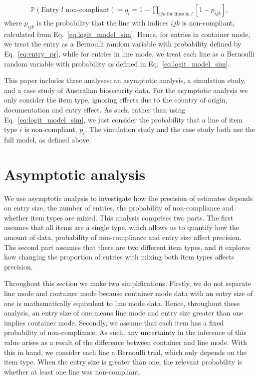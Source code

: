 \documentclass[aoas]{imsart}
\begin{document}
\begin{align}
\mathbb{P}\left(\text{Entry } l \text{ non-compliant}\right) = q_l = 1-\prod_{ijk \text{ for lines in }l}[1-p_{ijk}],\label{eq:entry_pr}
\end{align}
where  {$p_{ijk}$ is the probability that the line with indices $ijk$} is non-compliant, calculated from Eq.~\eqref{eq:logit_model_sim}.
Hence, for entries in container mode, we treat the entry  as a Bernoulli random variable with probability defined by Eq.~\eqref{eq:entry_pr}, while for entries in line mode, we treat each line as a Bernoulli random variable with probability as defined in Eq.~\eqref{eq:logit_model_sim}.


This paper includes three analyses: an asymptotic analysis,
 a simulation study, and a case study of Australian biosecurity data.  {For the asymptotic analysis we only consider the item type, ignoring effects due to the country of origin, documentation and entry effect. As such,} rather than using Eq.~\eqref{eq:logit_model_sim}, we just consider the probability that a line of item type \(i\) is non-compliant, \(p_i\). The simulation study and the case study both use the full model, as defined above. 

\section{Asymptotic analysis}\label{sec:asymptotic_analysis}
We use asymptotic analysis to investigate how the precision of estimates depends on entry size, the number of entries, the probability of non-compliance and whether item types are mixed. This analysis comprises two parts. The first assumes that all items are a single type, which allows us to quantify how the amount of data, probability of non-compliance  and entry size affect precision. The second part assumes that there are two different item types, and it explores how changing the proportion of entries with {mixing both item types} affects precision.

Throughout this section we make two simplifications. Firstly, we do not separate line mode and container mode because container mode data with an entry size of one is mathematically equivalent to line mode data. Hence, throughout these analysis, an entry size of one means line mode and entry size greater than one implies container mode. Secondly, we  assume that each item has a fixed probability of non-compliance.  {As such, any uncertainty in the inference of this value arises as a result of the difference between container and line mode. With this in hand,} we consider each line a Bernoulli trial, which only depends on the item type. When the entry size is greater than one, the relevant probability is whether at least one line was  {non-compliant.}
\end{document}
